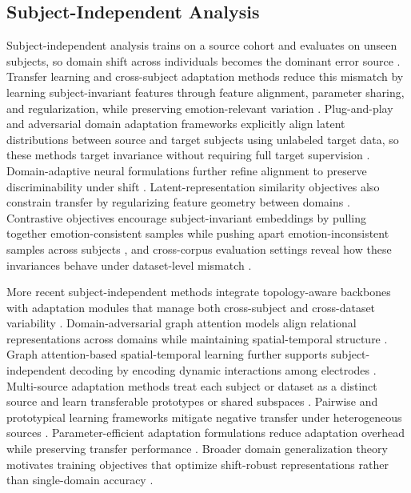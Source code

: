 \documentclass{WileyMSP-template}
\begin{document}
\subsection{Subject-Independent Analysis}

Subject-independent analysis trains on a source cohort and evaluates on unseen subjects, so domain shift across individuals becomes the dominant error source \cite{li2018emotion}. Transfer learning and cross-subject adaptation methods reduce this mismatch by learning subject-invariant features through feature alignment, parameter sharing, and regularization, while preserving emotion-relevant variation \cite{zhang2021cross,li2018emotion}. Plug-and-play and adversarial domain adaptation frameworks explicitly align latent distributions between source and target subjects using unlabeled target data, so these methods target invariance without requiring full target supervision \cite{zhao2021ppda}. Domain-adaptive neural formulations further refine alignment to preserve discriminability under shift \cite{bao2021tldann}. Latent-representation similarity objectives also constrain transfer by regularizing feature geometry between domains \cite{li2019lrs}. Contrastive objectives encourage subject-invariant embeddings by pulling together emotion-consistent samples while pushing apart emotion-inconsistent samples across subjects \cite{shen2022contrastive}, and cross-corpus evaluation settings reveal how these invariances behave under dataset-level mismatch \cite{rayatdoost2018crosscorpus}.

More recent subject-independent methods integrate topology-aware backbones with adaptation modules that manage both cross-subject and cross-dataset variability \cite{xu2023dagam}. Domain-adversarial graph attention models align relational representations across domains while maintaining spatial-temporal structure \cite{xu2023dagam,zhong2022graph}. Graph attention-based spatial-temporal learning further supports subject-independent decoding by encoding dynamic interactions among electrodes \cite{zhu2022gatstpl}. Multi-source adaptation methods treat each subject or dataset as a distinct source and learn transferable prototypes or shared subspaces \cite{li2023msfran}. Pairwise and prototypical learning frameworks mitigate negative transfer under heterogeneous sources \cite{zhou2023prpl}. Parameter-efficient adaptation formulations reduce adaptation overhead while preserving transfer performance \cite{zhang2022_parse}. Broader domain generalization theory motivates training objectives that optimize shift-robust representations rather than single-domain accuracy \cite{zhou2022dgsurvey}.
\end{document}
